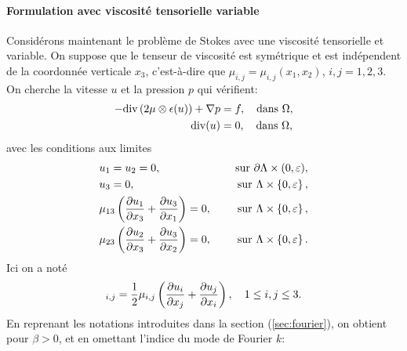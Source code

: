 \paragraph{Formulation avec viscosité tensorielle variable}
Considérons maintenant le problème de Stokes avec une viscosité
tensorielle et variable. On suppose que le tenseur de viscosité est
symétrique et est indépendent de la coordonnée verticale $x_3$,
c'est-à-dire que $\mu_{i,j} = \mu_{i,j}(x_1, x_2)$, $i,j = 1,2,3$. On
cherche la vitesse $u$ et la pression $p$ qui vérifient:
\begin{align}
  -\div\parent{2\mu\otimes \epsilon(u)} + \nabla p &= f, %
  \quad \text{dans } \Omega,\\
  \div(u) &= 0, %
  \quad \text{dans } \Omega,
\end{align}
avec les conditions aux limites
\begin{align}
  &u_1 = u_2 = 0, &\quad \text{ sur } \partial \Lambda \times
  (0,\varepsilon),\\
  &u_3 = 0, &\quad \text{ sur }  \Lambda \times \left\{ 0,\varepsilon \right\},\\
  &\mu_{13}\left( \frac{\partial u_1}{\partial x_3} + \frac{\partial u_3}{\partial
      x_1} \right) = 0, &\quad \text{ sur }  \Lambda \times \left\{ 0,\varepsilon \right\},\\
  &\mu_{23}\left( \frac{\partial u_2}{\partial x_3} + \frac{\partial u_3}{\partial
  x_2} \right) = 0, &\quad \text{ sur }  \Lambda \times \left\{ 0,\varepsilon \right\}.
\end{align}
Ici on a noté
\begin{equation}
  [\mu \otimes \straintensor(u)]_{i,j} %
  = \frac{1}{2}\mu_{i,j}\parent{\frac{\partial u_i}{\partial x_j} %
                              + \frac{\partial u_j}{\partial x_i}},%
  \quad 1\leq i,j\leq 3.
\end{equation}
En reprenant les notations introduites dans la section
(\ref{sec:fourier}), on obtient pour $\beta > 0$, et en omettant
l'indice du mode de Fourier $k$:
